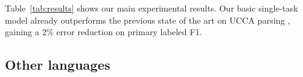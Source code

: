\documentclass[11pt,a4paper]{article}
\begin{document}
%
%
%
%


Table~\ref{tab:results} shows our main experimental results.
Our basic single-task model already outperforms the previous state of the art on
UCCA parsing \cite{hershcovich2017a}, gaining a 2\% error reduction on primary labeled F1.


\subsection{Other languages}\label{sec:multilingual}
\end{document}
